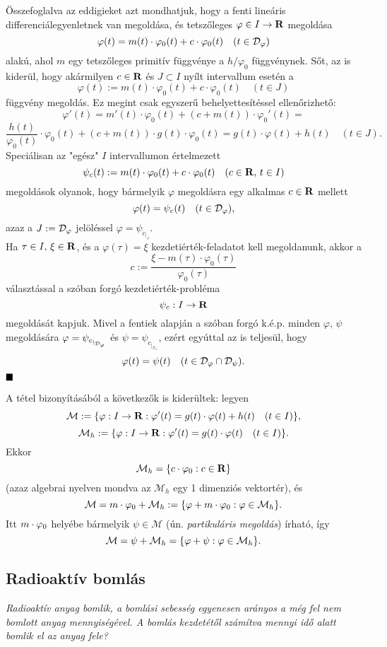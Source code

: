 Összefoglalva az eddigieket azt mondhatjuk, hogy a fenti lineáris differenciálegyenletnek van megoldása, és tetszőleges $\varphi \in I \to \mathbf{R}$ megoldása
\[
\varphi(t) = m(t) \cdot \varphi_0(t) + c \cdot \varphi_0(t) \quad (t \in \mathcal{D}_\varphi)
\]
alakú, ahol $m$ egy tetszőleges primitív függvénye a $h / \varphi_0$ függvénynek. Sőt, az is kiderül, hogy akármilyen $c \in \mathbf{R}$ és $J \subset I$ nyílt intervallum esetén a
\[
\varphi(t) := m(t) \cdot \varphi_0(t) + c \cdot \varphi_0(t) \quad (t \in J)
\]
függvény megoldás. Ez  megint csak egyszerű behelyettesítéssel ellenőrizhető:
\[
\varphi'(t) = m'(t) \cdot \varphi_0(t) + (c + m(t)) \cdot \varphi_0'(t) =
\]
\[
\frac{h(t)}{\varphi_0(t)} \cdot \varphi_0(t) + (c + m(t)) \cdot g(t) \cdot \varphi_0(t) = g(t) \cdot \varphi(t) + h(t) \quad (t \in J).
\]
Speciálisan az "egész" $I$ intervallumon értelmezett
\[
\psi_c(t) := m(t) \cdot \varphi_0(t) + c \cdot \varphi_0(t) \quad (c \in \mathbf{R}, \, t \in I)
\]
megoldások olyanok, hogy bármelyik $\varphi$ megoldásra egy alkalmas $c \in \mathbf{R}$ mellett
\[
\varphi(t) = \psi_c(t) \quad (t \in \mathcal{D}_\varphi),
\]
azaz a $J := \mathcal{D}_\varphi$ jelöléssel $\varphi = \psi_{c_{|_J}}$.\\

Ha $\tau \in I, \, \xi \in \mathbf{R}$, és a $\varphi(\tau) = \xi$ kezdetiérték-feladatot kell megoldanunk, akkor a
\[
c := \frac{\xi - m(\tau) \cdot \varphi_0(\tau)}{\varphi_0(\tau)}
\]
választással a szóban forgó kezdetiérték-probléma
\[
\psi_c : I \to \mathbf{R}
\]
megoldását kapjuk. Mivel a fentiek alapján a szóban forgó k.é.p. minden $\varphi, \, \psi$ megoldására $\varphi = \psi_{c_{|_{\mathcal{D}_\varphi}}}$ és $\psi = \psi_{c_{|_{\mathcal{D}_\psi}}}$, ezért egyúttal az is teljesül, hogy
\[
\varphi(t) = \psi(t) \quad (t \in \mathcal{D}_\varphi \cap \mathcal{D}_\psi).
\]
$\hfill \blacksquare$

A tétel bizonyításából a következők is kiderültek: legyen
\[
	\mathcal{M} := \{ \varphi : I \to \mathbf{R} : \varphi'(t) = g(t) \cdot \varphi(t) + h(t) \quad (t \in I) \},
\]
\[
	\mathcal{M}_h := \{ \varphi : I \to \mathbf{R} : \varphi'(t) = g(t) \cdot \varphi(t) \quad (t \in I) \}.
\]
Ekkor
\[
	\mathcal{M}_h = \{ c \cdot \varphi_0 : c \in \mathbf{R} \}
\]
(azaz algebrai nyelven mondva az $\mathcal{M}_h$ egy 1 dimenziós vektortér), és
\[
	\mathcal{M} = m \cdot \varphi_0 + \mathcal{M}_h := \{ \varphi + m \cdot \varphi_0 : \varphi \in \mathcal{M}_h \}.
\]
Itt $m \cdot \varphi_0$ helyébe bármelyik $\psi \in \mathcal{M}$ (ún. \textit{partikuláris megoldás}) írható, így
\[
	\mathcal{M} = \psi + \mathcal{M}_h = \{ \varphi + \psi : \varphi \in \mathcal{M}_h \}.
\]

\subsection{Radioaktív bomlás}
\textit{Radioaktív anyag bomlik, a bomlási sebesség egyenesen arányos a még fel nem bomlott anyag mennyiségével. A bomlás kezdetétől számítva mennyi idő alatt bomlik el az anyag fele?}\\

